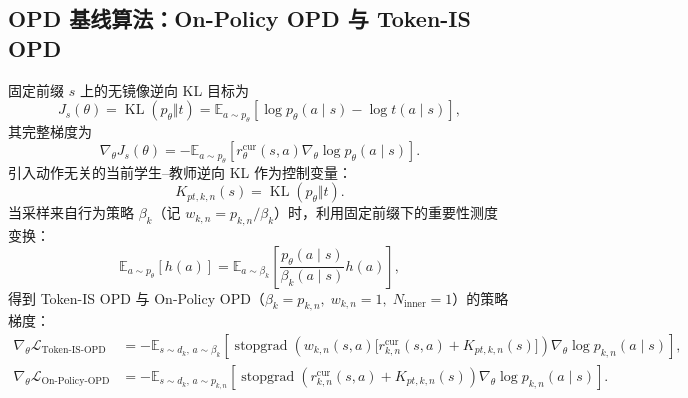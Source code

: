 \documentclass[lang=cn,scheme=chinese,openany]{elegantbook}
\newcommand{\sg}{\operatorname{stopgrad}}
\begin{document}
\subsection{OPD 基线算法：On-Policy OPD 与 Token-IS OPD}
\label{subsec:ch2-opd-baselines-in-map}
\label{subsec:ch2-opd-onpolicy-baseline}
\label{subsec:ch2-opd-is-baseline}

固定前缀 $s$ 上的无镜像逆向 KL 目标为
\begin{equation}
\label{eq:ch2-opd-baseline-objective}
J_s(\theta)=\operatorname{KL}(p_\theta\Vert t)
 =\mathbb E_{a\sim p_\theta}
 \left[\log p_\theta(a\mid s)-\log t(a\mid s)\right],
\end{equation}
其完整梯度为
\begin{equation}
\label{eq:ch2-opd-baseline-gradient}
\nabla_\theta J_s(\theta)
 =-\mathbb E_{a\sim p_\theta}
 \left[r_\theta^{\mathrm{cur}}(s,a)\nabla_\theta\log p_\theta(a\mid s)\right].
\end{equation}
引入动作无关的当前学生--教师逆向 KL 作为控制变量：
\begin{equation}
\label{eq:ch2-opd-vopd-center}
 K_{pt,k,n}(s)=\operatorname{KL}(p_\theta\Vert t).
\end{equation}
当采样来自行为策略 $\beta_k$（记 $w_{k,n}=p_{k,n}/\beta_k$）时，利用固定前缀下的重要性测度变换：
\begin{equation}
\label{eq:ch2-opd-token-is}
\mathbb E_{a\sim p_\theta}[h(a)]
 =\mathbb E_{a\sim \beta_k}
 \left[\frac{p_\theta(a\mid s)}{\beta_k(a\mid s)}h(a)\right],
\end{equation}
得到 Token-IS OPD 与 On-Policy OPD（$\beta_k=p_{k,n},\; w_{k,n}=1,\; N_{\mathrm{inner}}=1$）的策略梯度：
\begin{align}
\nabla_\theta\mathcal L_{\mathrm{Token\text{-}IS\text{-}OPD}}
&=-\mathbb E_{s\sim d_k,\,a\sim\beta_k}
\left[\sg\!\left(w_{k,n}(s,a)\bigl[r_{k,n}^{\mathrm{cur}}(s,a)+K_{pt,k,n}(s)\bigr]\right)
\nabla_\theta\log p_{k,n}(a\mid s)\right],
\label{eq:ch2-opd-is-pg,eq:ch2-token-is-opd-pg}\\
\nabla_\theta\mathcal L_{\mathrm{On\text{-}Policy\text{-}OPD}}
&=-\mathbb E_{s\sim d_k,\,a\sim p_{k,n}}
\left[\sg\!\left(r_{k,n}^{\mathrm{cur}}(s,a)+K_{pt,k,n}(s)\right)
\nabla_\theta\log p_{k,n}(a\mid s)\right].
\label{eq:ch2-onpolicy-opd-pg}
\end{align}
\end{document}
